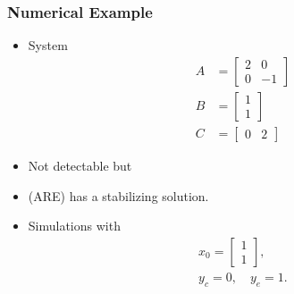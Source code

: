 \documentclass[xcolor=dvipsnames,10pt,hyperref={breaklinks=true}]{beamer}
\begin{document}
\begin{frame}
  \frametitle{Numerical Example}
  \begin{minipage}[t]{0.4\linewidth}
  \begin{itemize}
    \item System
  \begin{equation*}
    \begin{split}
    A &= 
    \begin{bmatrix}
      2 & 0 \\ 0 & -1 
    \end{bmatrix}\\
    B &= 
    \begin{bmatrix}
      1 \\ 1 
    \end{bmatrix}\\
    C &= 
    \begin{bmatrix}
      0 & 2 
    \end{bmatrix}
  \end{split}
  \end{equation*}
    \item Not detectable but
    \item (ARE) has a stabilizing solution.
    \item 
  Simulations with
  \begin{equation*}
    \begin{split}
    x_0=
    \begin{bmatrix}
      1 \\ 1 
    \end{bmatrix}, \\y_c=0, \quad y_e=1.
  \end{split}
  \end{equation*}
  \end{itemize}
  \vfill
  \end{minipage}%
\end{frame}
\end{document}
